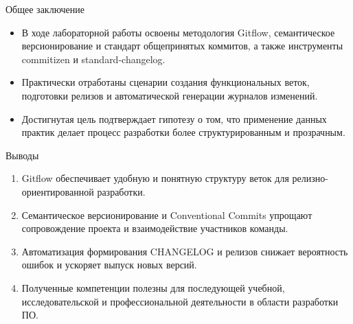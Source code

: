 \documentclass[
  ignorenonframetext,
  aspectratio=169,
  russian,
  aspectratio=169]{beamer}
\providecommand{\tightlist}{%
  \setlength{\itemsep}{0pt}\setlength{\parskip}{0pt}}
\begin{document}
\begin{frame}{Общее заключение}
\label{ux43eux431ux449ux435ux435-ux437ux430ux43aux43bux44eux447ux435ux43dux438ux435}
\begin{itemize}[<+->]
\tightlist
\item
  В ходе лабораторной работы освоены методология Gitflow, семантическое
  версионирование и стандарт общепринятых коммитов, а также инструменты
  commitizen и standard-changelog.
\item
  Практически отработаны сценарии создания функциональных веток,
  подготовки релизов и автоматической генерации журналов изменений.
\item
  Достигнутая цель подтверждает гипотезу о том, что применение данных
  практик делает процесс разработки более структурированным и
  прозрачным.
\end{itemize}
\end{frame}

\begin{frame}{Выводы}
\label{ux432ux44bux432ux43eux434ux44b-1}
\begin{enumerate}[<+->]
\tightlist
\item
  Gitflow обеспечивает удобную и понятную структуру веток для
  релизно-ориентированной разработки.
\item
  Семантическое версионирование и Conventional Commits упрощают
  сопровождение проекта и взаимодействие участников команды.
\item
  Автоматизация формирования CHANGELOG и релизов снижает вероятность
  ошибок и ускоряет выпуск новых версий.
\item
  Полученные компетенции полезны для последующей учебной,
  исследовательской и профессиональной деятельности в области разработки
  ПО.
\end{enumerate}
\end{frame}
\end{document}
